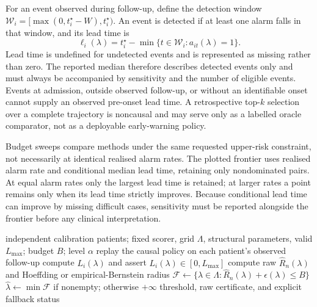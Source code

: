 For an event observed during follow-up, define the detection window $\mathcal W_i=[\max(0,t_i^\star-W),t_i^\star)$. An event is detected if at least one alarm falls in that window, and its lead time is
\begin{equation}
\label{eq:lead}
\ell_i(\lambda)=t_i^\star-\min\{t\in\mathcal W_i:a_{it}(\lambda)=1\}.
\end{equation}
Lead time is undefined for undetected events and is represented as missing rather than zero. The reported median therefore describes detected events only and must always be accompanied by sensitivity and the number of eligible events. Events at admission, outside observed follow-up, or without an identifiable onset cannot supply an observed pre-onset lead time. A retrospective top-$k$ selection over a complete trajectory is noncausal and may serve only as a labelled oracle comparator, not as a deployable early-warning policy.

Budget sweeps compare methods under the same requested upper-risk constraint, not necessarily at identical realised alarm rates. The plotted frontier uses realised alarm rate and conditional median lead time, retaining only nondominated pairs. At equal alarm rates only the largest lead time is retained; at larger rates a point remains only when its lead time strictly improves. Because conditional lead time can improve by missing difficult cases, sensitivity must be reported alongside the frontier before any clinical interpretation.

\begin{algorithm}[tb]
\caption{Patient-blocked upper-confidence calibration of an alarm policy}
\label{alg:calibration}
\begin{algorithmic}[1]
\Require independent calibration patients; fixed scorer, grid $\Lambda$, structural parameters, valid $L_{\max}$; budget $B$; level $\alpha$
\For{$\lambda\in\Lambda$}
  \State replay the causal policy on each patient's observed follow-up
  \State compute $L_i(\lambda)$ and assert $L_i(\lambda)\in[0,L_{\max}]$
  \State compute raw $\widehat R_n(\lambda)$ and Hoeffding or empirical-Bernstein radius
\EndFor
\State $\mathcal F\leftarrow\{\lambda\in\Lambda:\widehat R_n(\lambda)+\epsilon(\lambda)\le B\}$
\State $\widehat\lambda\leftarrow\min\mathcal F$ if nonempty; otherwise $+\infty$
\State \Return threshold, raw certificate, and explicit fallback status
\end{algorithmic}
\end{algorithm}
